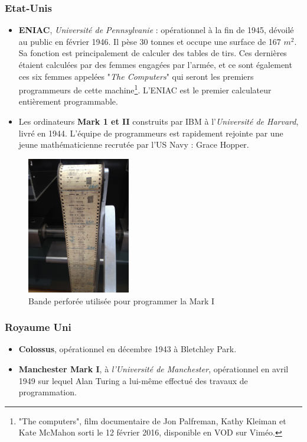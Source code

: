 \documentclass[a4paper,11pt]{book}
\begin{document}
\subsubsection{Etat-Unis}
\begin{itemize}
    \item \textbf{ENIAC}, \textit{Université de Pennsylvanie} :  opérationnel à la fin de 1945, dévoilé au public en février 1946. Il pèse 30 tonnes et occupe une surface de 167 $m^2$. Sa fonction est principalement de calculer des tables de tirs. Ces dernières étaient calculées par des femmes engagées par l'armée, et ce sont également ces six femmes appelées "\textit{The Computers}" qui seront les premiers programmeurs de cette machine\footnote{"The computers", film documentaire de Jon Palfreman, Kathy Kleiman et Kate McMahon sorti le 12 février 2016, disponible en VOD sur Viméo.}. L'ENIAC est le premier calculateur entièrement programmable.
    \item Les ordinateurs \textbf{Mark 1 et II} construits par IBM à l'\textit{Université de Harvard}, livré en 1944. L'équipe de programmeurs est rapidement rejointe par une jeune mathématicienne recrutée par l'US Navy : Grace Hopper.
\end{itemize}

\begin{figure}[h]
    \centering
    \includegraphics[width=0.4\textwidth]{media/machines/Harvard_Mark_I_program_tape.agr.jpg}
    \caption{Bande perforée utilisée pour programmer la Mark I}
\end{figure}

\subsubsection{Royaume Uni}
\begin{itemize}
    \item \textbf{Colossus}, opérationnel en décembre 1943 à Bletchley Park.
    \item \textbf{Manchester Mark I}, à \textit{l'Université de Manchester}, opérationnel en avril 1949 sur lequel Alan Turing a lui-même effectué des travaux de programmation.
\end{itemize}
\end{document}
